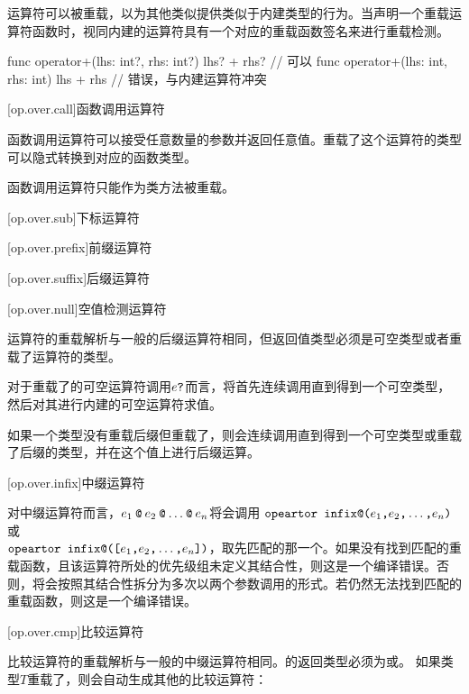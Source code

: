\pnum
运算符可以被重载，以为其他类似提供类似于内建类型的行为。当声明一个重载运算符函数时，视同内建的运算符具有一个对应的重载函数签名来进行重载检测。

\enterexample
\begin{codeblock}
func operator+(lhs: int?, rhs: int?) { lhs? + rhs? } // 可以
func operator+(lhs: int, rhs: int) { lhs + rhs } // 错误，与内建运算符冲突
\end{codeblock}
\exitexample

[op.over.call]{函数调用运算符}

\pnum
函数调用运算符可以接受任意数量的参数并返回任意值。重载了这个运算符的类型可以隐式转换到对应的函数类型。

\pnum
函数调用运算符只能作为类方法被重载。

[op.over.sub]{下标运算符}

[op.over.prefix]{前缀运算符}

[op.over.suffix]{后缀运算符}

[op.over.null]{空值检测运算符}

\pnum
{}运算符的重载解析与一般的后缀运算符相同，但返回值类型必须是可空类型或者重载了运算符的类型。

\pnum
对于重载了的可空运算符调用$e\texttt{?}$而言，将首先连续调用直到得到一个可空类型，然后对其进行内建的可空运算符求值。

\pnum
如果一个类型没有重载后缀\tcode{!}但重载了，则会连续调用直到得到一个可空类型或重载了后缀\tcode{!}的类型，并在这个值上进行后缀\tcode{!}运算。

[op.over.infix]{中缀运算符}

\pnum
对中缀运算符而言，$e_1\mathbin{\texttt{@}}e_2\mathbin{\texttt{@}}\ldots\mathbin{\texttt{@}}e_n$将会调用
$\texttt{opeartor infix@(}e_1\texttt{,}e_2\texttt{,}\ldots\texttt{,}e_n\texttt{)}$或\\$\texttt{opeartor infix@([}e_1\texttt{,}e_2\texttt{,}\ldots\texttt{,}e_n\texttt{])}$，取先匹配的那一个。如果没有找到匹配的重载函数，且该运算符所处的优先级组未定义其结合性，则这是一个编译错误。否则，将会按照其结合性拆分为多次以两个参数调用的形式。若仍然无法找到匹配的重载函数，则这是一个编译错误。

[op.over.cmp]{比较运算符}

\pnum
比较运算符的重载解析与一般的中缀运算符相同。的返回类型必须为或。
如果类型$T$重载了，则会自动生成其他的比较运算符：

